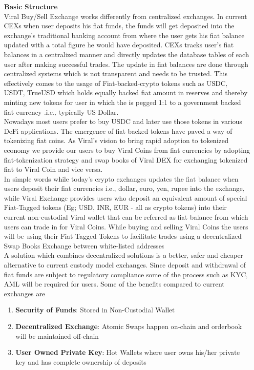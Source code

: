 \documentclass[10pt]{article}
\begin{document}
\textbf{Basic Structure}\\

Viral Buy/Sell Exchange works differently from centralized exchanges. In current CEXs when user deposits his fiat funds, the funds will get deposited into the exchange's traditional banking account from where the user gets his fiat balance updated with a total figure he would have deposited. CEXs tracks user's fiat balances in a centralized manner and directly updates the database tables of each user after making successful trades. The update in fiat balances are done through centralized systems which is not transparent and needs to be trusted. This effectively comes to the usage of Fiat-backed-crypto tokens such as USDC, USDT, TrueUSD which holds equally backed fiat amount in reserves and thereby minting new tokens for user in which the is pegged 1:1 to a government backed fiat currency .i.e., typically US Dollar.\\

Nowadays most users prefer to buy USDC and later use those tokens in various DeFi applications. The emergence of fiat backed tokens have paved a way of tokenizing fiat coins. As Viral's vision to bring rapid adoption to tokenized economy we provide our users to buy Viral Coins from fiat currencies by adopting fiat-tokenization strategy and swap books of Viral DEX for exchanging tokenized fiat to Viral Coin and vice versa.\\

In simple words while today's crypto exchanges updates the fiat balance when users deposit their fiat currencies i.e., dollar, euro, yen, rupee into the exchange, while Viral Exchange provides users who deposit an equivalent amount of special Fiat-Tagged tokens (Eg; USD, INR, EUR - all as crypto tokens) into their current non-custodial Viral wallet that can be referred as fiat balance from which users can trade in for Viral Coins. While buying and selling Viral Coins the users will be using their Fiat-Tagged Tokens to facilitate trades using a decentralized Swap Books Exchange between white-listed addresses\\

A solution which combines decentralized solutions is a better, safer and cheaper alternative to current custody model exchanges. Since deposit and withdrawal of fiat funds are subject to regulatory compliance some of the process such as KYC, AML will be required for users. Some of the benefits compared to current exchanges are
\begin{enumerate}[leftmargin=+0.2in]
\item \textbf{Security of Funds}: Stored in Non-Custodial Wallet
\item \textbf{Decentralized Exchange}: Atomic Swaps happen on-chain and orderbook will be maintained off-chain
\item \textbf{User Owned Private Key}: Hot Wallets where user owns his/her private key and has complete ownership of deposits
\end{enumerate}
\end{document}
